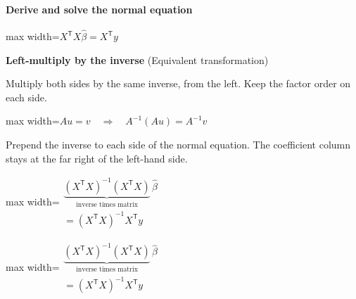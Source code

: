 \documentclass[11pt,a4paper]{article}
\begin{document}
\paragraph{Derive and solve the normal equation}
\begin{center}\begin{adjustbox}{max width=\linewidth}$\displaystyle X^{\mathsf T}X\widehat\beta=X^{\mathsf T}y$\end{adjustbox}\end{center}
\noindent\textbf{Left-multiply by the inverse} (Equivalent transformation)\par
Multiply both sides by the same inverse, from the left. Keep the factor order on each side.
\begin{center}\begin{adjustbox}{max width=\linewidth}$\displaystyle Au=v\quad\Longrightarrow\quad A^{-1}(Au)=A^{-1}v$\end{adjustbox}\end{center}

Prepend the inverse to each side of the normal equation. The coefficient column stays at the far right of the left-hand side.
\begin{center}\begin{adjustbox}{max width=\linewidth}$\displaystyle \begin{gathered}\underbrace{(X^{\mathsf T}X)^{-1}(X^{\mathsf T}X)}_{\text{inverse times matrix}}\,\widehat\beta\\[.28em]=(X^{\mathsf T}X)^{-1}X^{\mathsf T}y\end{gathered}$\end{adjustbox}\end{center}


\begin{center}\begin{adjustbox}{max width=\linewidth}$\displaystyle \begin{gathered}\underbrace{(X^{\mathsf T}X)^{-1}(X^{\mathsf T}X)}_{\text{inverse times matrix}}\,\widehat\beta\\[.28em]=(X^{\mathsf T}X)^{-1}X^{\mathsf T}y\end{gathered}$\end{adjustbox}\end{center}
\end{document}
